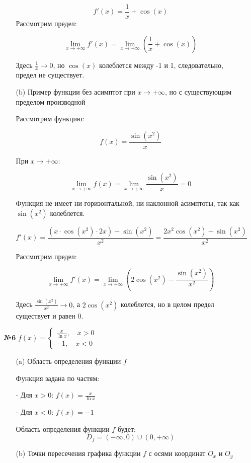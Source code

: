\documentclass[a4paper]{article}
\renewcommand{\f}[2]{\frac{#1}{#2}}
\newcommand{\case}[1]{\begin{cases} #1 \end{cases}}
\begin{document}
\begin{enumerate}
\begin{enumerate}
        $$
        f'(x) = \frac{1}{x} + \cos(x)
        $$
        Рассмотрим предел:

        $$
        \lim_{x \rightarrow +\infty} f'(x) = \lim_{x \rightarrow +\infty} \left( \frac{1}{x} + \cos(x) \right)
        $$

        Здесь $ \frac{1}{x} \rightarrow 0 $, но $ \cos(x) $ колеблется между -1 и 1, следовательно, предел не существует.

        \item[(b)]Пример функции без асимптот при $ x \rightarrow +\infty $, но с существующим пределом производной

        Рассмотрим функцию:
        
        $$
        f(x) = \frac{\sin(x^2)}{x}
        $$

        При $ x \rightarrow +\infty $:

        $$
        \lim_{x \rightarrow +\infty} f(x) = \lim_{x \rightarrow +\infty} \frac{\sin(x^2)}{x} = 0
        $$

        Функция не имеет ни горизонтальной, ни наклонной асимптоты, так как $ \sin(x^2) $ колеблется.
   
        $$
        f'(x) = \frac{(x \cdot \cos(x^2) \cdot 2x) - \sin(x^2)}{x^2} = \frac{2x^2 \cos(x^2) - \sin(x^2)}{x^2}
        $$

        Рассмотрим предел:

        $$
        \lim_{x \rightarrow +\infty} f'(x) = \lim_{x \rightarrow +\infty} \left( 2 \cos(x^2) - \frac{\sin(x^2)}{x^2} \right)
        $$

        Здесь $ \frac{\sin(x^2)}{x^2} \rightarrow 0 $, а $ 2 \cos(x^2) $ колеблется, но в целом предел существует и равен 0.

    \end{enumerate}

    \item[\textbf{№6}]$f(x) = \case{
        \f{x}{\ln{x}}, \quad x>0\\
        -1, \quad x<0
    }$
    
    \begin{enumerate}
        \item[(a)]Область определения функции $ f $

        Функция задана по частям:

        - Для $ x > 0 $: $ f(x) = \frac{x}{\ln x} $

        - Для $ x < 0 $: $ f(x) = -1 $
        
        Область определения функции $ f $ будет:
        $$
        D_f = (-\infty, 0) \cup (0, +\infty)
        $$
        \item[(b)]Точки пересечения графика функции $ f $ с осями координат $ O_x $ и $ O_y $
        

\end{enumerate}
\end{enumerate}
\end{document}
